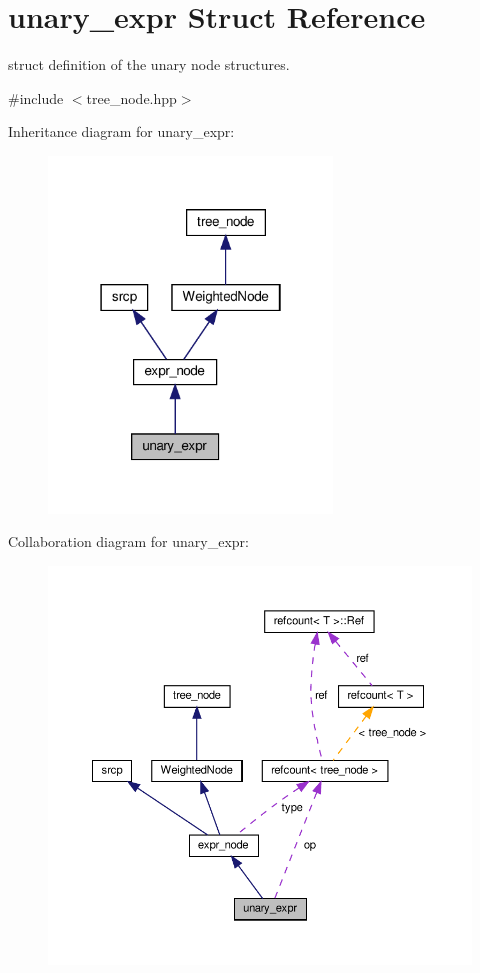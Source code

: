 \hypertarget{structunary__expr}{}\section{unary\+\_\+expr Struct Reference}
\label{structunary__expr}


struct definition of the unary node structures.  




{\ttfamily \#include $<$tree\+\_\+node.\+hpp$>$}



Inheritance diagram for unary\+\_\+expr\+:
\nopagebreak
\begin{figure}[H]
\begin{center}
\leavevmode
\includegraphics[width=214pt]{d6/d5d/structunary__expr__inherit__graph}
\end{center}
\end{figure}


Collaboration diagram for unary\+\_\+expr\+:
\nopagebreak
\begin{figure}[H]
\begin{center}
\leavevmode
\includegraphics[width=350pt]{d3/d7e/structunary__expr__coll__graph}
\end{center}
\end{figure}
